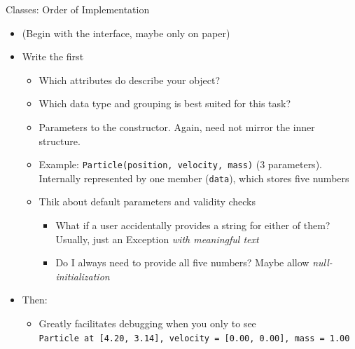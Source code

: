 \begin{frame}{Classes: Order of Implementation}
%
\begin{itemize}
\item (Begin with the interface, maybe only on paper)
\item Write the  first
	\begin{itemize}
	\item Which attributes do describe your object?
	\item Which data type and grouping is best suited for this task?
	\item Parameters to the constructor. Again, need not mirror the inner structure.
	\item Example: \texttt{Particle(position, velocity, mass)} (3 parameters). Internally represented by one member (\texttt{data}), which stores five numbers
	\item Thik about default parameters and validity checks
		\begin{itemize}
		\item What if a user accidentally provides a string for either of them?\\
			Usually, just  an Exception \emph{with meaningful text}
		\item Do I always need to provide all five numbers? Maybe allow \emph{null-initialization}
		\end{itemize}
	\end{itemize}
\item Then: 
	\begin{itemize}
	\item Greatly facilitates debugging when you only  to see\\
		\texttt{Particle at [4.20, 3.14], velocity = [0.00, 0.00], mass = 1.00}
	\end{itemize}
\end{itemize}
%
\end{frame}


